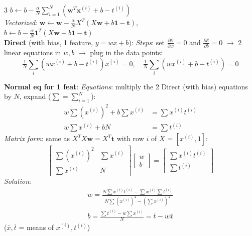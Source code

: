\documentclass[10pt]{article}
\newcommand{\vx}{\mathbf{x}}
\newcommand{\vw}{\mathbf{w}}
\newcommand{\vt}{\mathbf{t}}
\newcommand{\cE}{\mathcal{E}}
\newcommand{\sub}[1]{\textit{#1}:}  %
\begin{document}
\begin{multicols*}{3}
$b\leftarrow b-\frac{\alpha}{N}\sum_{i=1}^N(\vw^T\vx^{(i)}+b-t^{(i)})$\\
\sub{Vectorized} $\vw\leftarrow\vw-\frac{\alpha}{N}X^T(X\vw+b\mathbf 1-\vt)$,\\
$b\leftarrow b-\frac{\alpha}{N}\mathbf 1^T(X\vw+b\mathbf 1-\vt)$\\
\textbf{Direct} (with bias, 1 feature, $y=wx+b$): \sub{Steps} set $\frac{\partial\cE}{\partial w}=0$ and $\frac{\partial\cE}{\partial b}=0$ $\to$ 2 linear equations in $w,b$ $\to$ plug in the data points:
\[ \tfrac1N\textstyle\sum_i(wx^{(i)}+b-t^{(i)})x^{(i)}=0,\quad \tfrac1N\sum_i(wx^{(i)}+b-t^{(i)})=0 \]
\begin{minipage}{\linewidth}
\textbf{Normal eq for 1 feat}: \sub{Equations} multiply the 2 Direct (with bias) equations by $N$, expand ($\sum=\sum_{i=1}^N$):
\begin{align*}
w\textstyle\sum(x^{(i)})^2+b\sum x^{(i)}&=\textstyle\sum x^{(i)}t^{(i)}\\
w\textstyle\sum x^{(i)}+bN&=\textstyle\sum t^{(i)}
\end{align*}
\sub{Matrix form} same as $X^TX\vw=X^T\vt$ with row $i$ of $X$ = $[x^{(i)},1]$:
\[ \begin{bmatrix}\sum(x^{(i)})^2&\sum x^{(i)}\\\sum x^{(i)}&N\end{bmatrix}\begin{bmatrix}w\\b\end{bmatrix}=\begin{bmatrix}\sum x^{(i)}t^{(i)}\\\sum t^{(i)}\end{bmatrix} \]
\sub{Solution}
\begin{gather*}
w=\frac{N\sum x^{(i)}t^{(i)}-\sum x^{(i)}\sum t^{(i)}}{N\sum(x^{(i)})^2-\left(\sum x^{(i)}\right)^2}\\
b=\frac{\sum t^{(i)}-w\sum x^{(i)}}{N}=\bar t-w\bar x
\end{gather*}
($\bar x,\bar t$ = means of $x^{(i)},t^{(i)}$)
\end{minipage}


\end{multicols*}
\end{document}
